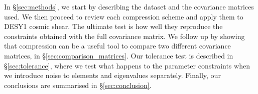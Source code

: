\documentclass[twocolumn]{\docclass}
\newcommand{\rsec}[1]{\S\ref{sec:#1}}
\newcommand{\rssec}[1]{\S\ref{subsec:#1}}
\begin{document}
	In \rsec{methods}, we start by describing the dataset and the covariance matrices used. We then proceed to review each compression scheme and apply them to DESY1 cosmic shear.  The ultimate test is how well they reproduce the constraints obtained with the full covariance matrix. %
	We follow up by showing that compression can be a useful tool to compare two different covariance matrices, in \rsec{comparison_matrices}. %
	Our tolerance test is described in \rsec{tolerance}, where we test what happens to the parameter constraints when we introduce noise to elements and eigenvalues separately. Finally, our conclusions are summarised in \rsec{conclusion}.
	
	
	
\end{document}
